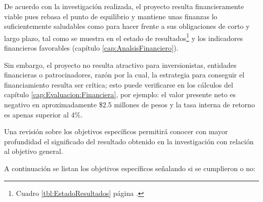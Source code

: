 De acuerdo con la investigación realizada, el proyecto resulta financieramente viable pues rebasa el punto de equilibrio y mantiene unas finanzas lo suficientemente saludables como para hacer frente a sus obligaciones de corto y largo plazo, tal como se muestra en el estado de resultados\footnote{Cuadro \ref{tbl:EstadoResultados} página \pageref{tbl:EstadoResultados}.} y los indicadores financieros favorables (capítulo \ref{cap:AnalsisFinanciero}).

Sin embargo, el proyecto no resulta atractivo para inversionistas, entidades financieras o patrocinadores, razón por la cual, la estrategia para conseguir el financiamiento resulta ser crítica; esto puede verificarse en los cálculos del capítulo \ref{cap:Evaluacion:Financiera}, por ejemplo: el valor presente neto es negativo en aproximadamente \$2.5 millones de pesos y la tasa interna de retorno es apenas superior al 4\%.


% 

Una revisión sobre los objetivos específicos permitirá conocer con mayor profundidad el significado del resultado obtenido en la investigación con relación al objetivo general.

A continuación se listan los objetivos específicos señalando si se cumplieron o no:

